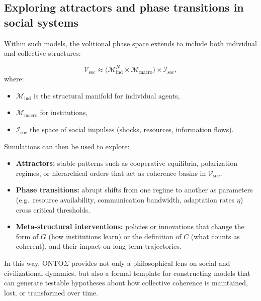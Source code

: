 \documentclass[12pt,a4paper]{report}
\begin{document}
\subsection*{Exploring attractors and phase transitions in social systems}

Within such models, the volitional phase space extends to include both individual and collective structures:

\[
    \mathcal{V}_{\mathrm{soc}} \approx 
        \bigl(\mathcal{M}_{\mathrm{ind}}^{N} \times \mathcal{M}_{\mathrm{macro}}\bigr)
        \times \mathcal{I}_{\mathrm{soc}},
\]
where:

\begin{itemize}[leftmargin=2em]
    \item \(\mathcal{M}_{\mathrm{ind}}\) is the structural manifold for individual agents,
    \item \(\mathcal{M}_{\mathrm{macro}}\) for institutions,
    \item \(\mathcal{I}_{\mathrm{soc}}\) the space of social impulses (shocks, resources, information flows).
\end{itemize}

Simulations can then be used to explore:

\begin{itemize}[leftmargin=2em]
    \item \textbf{Attractors:} stable patterns such as cooperative equilibria, polarization regimes, or hierarchical orders that act as coherence basins in \(\mathcal{V}_{\mathrm{soc}}\).
    \item \textbf{Phase transitions:} abrupt shifts from one regime to another as parameters (e.g.\ resource availability, communication bandwidth, adaptation rates \(\eta\)) cross critical thresholds.
    \item \textbf{Meta-structural interventions:} policies or innovations that change the form of \(G\) (how institutions learn) or the definition of \(C\) (what counts as coherent), and their impact on long-term trajectories.
\end{itemize}

In this way, ONTO$\Sigma$ provides not only a philosophical lens on social and civilizational dynamics, but also a formal template for constructing models that can generate testable hypotheses about how collective coherence is maintained, lost, or transformed over time.


\end{document}
